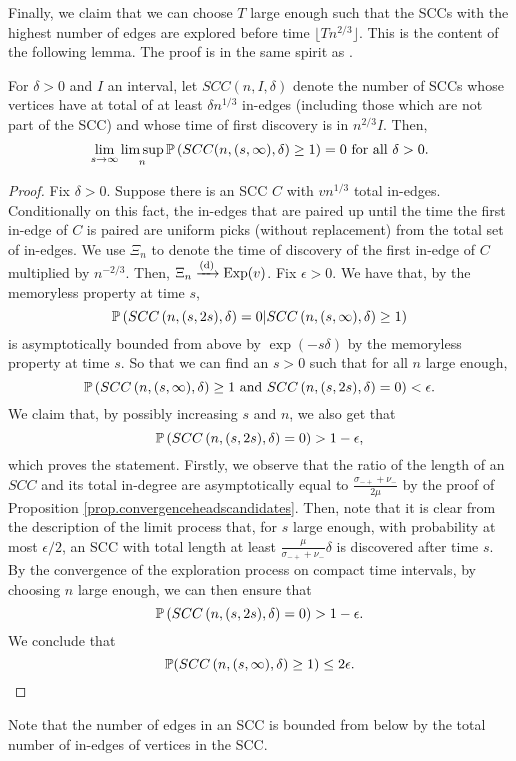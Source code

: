 Finally, we claim that we can choose $T$ large enough such that the SCCs with the highest number of edges are explored before time $\lfloor Tn^{2/3}\rfloor$. This is the content of the following lemma. The proof is in the same spirit as \citet[Lemma 9]{aldous_1991}.
\begin{lemma}\label{lemma.largesccfoundfirst}
For $\delta>0$ and $I$ an interval, let $SCC(n,I,\delta)$ denote the number of SCCs whose vertices have at total of at least $\delta n^{1/3}$ in-edges (including those which are not part of the SCC) and whose time of first discovery is in $n^{2/3}I$. Then,
$$\lim_{s\to \infty}\limsup_{n} \P\left(SCC(n,(s,\infty),\delta)\geq 1\right)=0\text{ for all }\delta>0.$$
\end{lemma}
\begin{proof}
Fix $\delta>0$. Suppose there is an SCC $C$ with $vn^{1/3}$ total in-edges. Conditionally on this fact, the in-edges that are paired up until the time the first in-edge of $C$ is paired are uniform picks (without replacement) from the total set of in-edges. We use $\Xi_n$ to denote the time of discovery of the first in-edge of $C$ multiplied by $n^{-2/3}$. Then, $\Xi_n\todist\operatorname{Exp}(v)$. Fix $\epsilon>0$. We have that, by the memoryless property at time $s$,
$$\P\left(SCC\left(n,(s,2s),\delta\right)=0|SCC\left(n,(s,\infty),\delta\right)\geq 1\right)$$
is asymptotically bounded from above by 
$\exp(-s\delta)$ by the memoryless property at time $s$. So that we can find an $s>0$ such that for all $n$ large enough,
$$\P\left(SCC\left(n,(s,\infty),\delta\right)\geq 1 \text{ and }SCC\left(n,(s,2s),\delta\right)=0\right)<\epsilon.$$
We claim that, by possibly increasing $s$ and $n$, we also get that 
$$\P\left(SCC\left(n,(s,2s),\delta\right)=0\right)>1-\epsilon,$$
which proves the statement.
Firstly, we observe that the ratio of the length of an $SCC$ and its total in-degree are asymptotically equal to $\frac{\sigma_{-+}+\nu_-}{2\mu}$ by the proof of Proposition \ref{prop.convergenceheadscandidates}. Then, note that it is clear from the description of the limit process that, for $s$ large enough, with probability at most $\epsilon/2$, an SCC with total length at least $\frac{\mu}{\sigma_{-+}+\nu_-}\delta$ is discovered after time $s$. By the convergence of the exploration process on compact time intervals, by choosing $n$ large enough, we can then ensure that 
$$\P\left(SCC\left(n,(s,2s),\delta\right)=0\right)>1-\epsilon.$$
We conclude that 
\begin{equation*}
    \P(SCC\left(n,(s,\infty),\delta\right)\geq 1)\leq 2\epsilon. \qedhere
\end{equation*}
\end{proof}
Note that the number of edges in an SCC is bounded from below by the total number of in-edges of vertices in the SCC.

